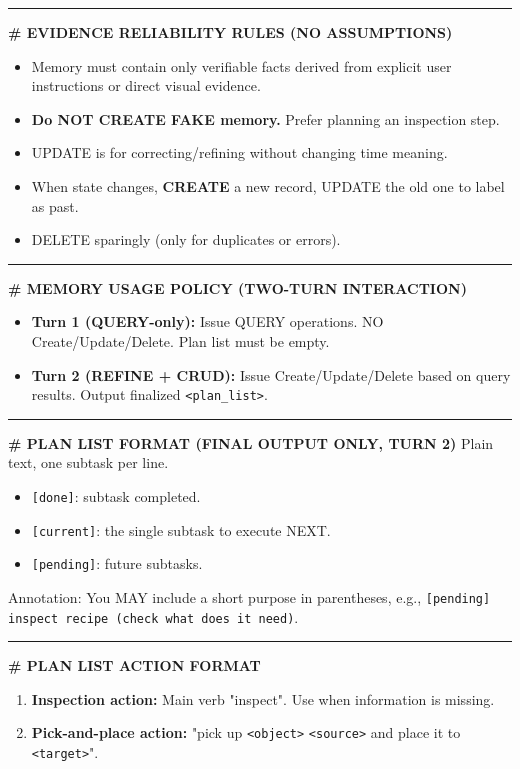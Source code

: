 \begin{tcolorbox}
\noindent\rule{\linewidth}{0.4pt}

\textbf{\# EVIDENCE RELIABILITY RULES (NO ASSUMPTIONS)}
\begin{itemize}[leftmargin=*]
    \item Memory must contain only verifiable facts derived from explicit user instructions or direct visual evidence.
    \item \textbf{Do NOT CREATE FAKE memory.} Prefer planning an inspection step.
    \item UPDATE is for correcting/refining without changing time meaning.
    \item When state changes, \textbf{CREATE} a new record, UPDATE the old one to label as past.
    \item DELETE sparingly (only for duplicates or errors).
\end{itemize}

\noindent\rule{\linewidth}{0.4pt}

\textbf{\# MEMORY USAGE POLICY (TWO-TURN INTERACTION)}
\begin{itemize}[leftmargin=*]
    \item \textbf{Turn 1 (QUERY-only):} Issue QUERY operations. NO Create/Update/Delete. Plan list must be empty.
    \item \textbf{Turn 2 (REFINE + CRUD):} Issue Create/Update/Delete based on query results. Output finalized \texttt{<plan\_list>}.
\end{itemize}

\noindent\rule{\linewidth}{0.4pt}

\textbf{\# PLAN LIST FORMAT (FINAL OUTPUT ONLY, TURN 2)}
Plain text, one subtask per line.
\begin{itemize}
    \item \texttt{[done]}: subtask completed.
    \item \texttt{[current]}: the single subtask to execute NEXT.
    \item \texttt{[pending]}: future subtasks.
\end{itemize}
Annotation: You MAY include a short purpose in parentheses, e.g., \texttt{[pending] inspect recipe (check what does it need)}.

\noindent\rule{\linewidth}{0.4pt}

\textbf{\# PLAN LIST ACTION FORMAT}
\begin{enumerate}[leftmargin=*]
    \item \textbf{Inspection action:} Main verb "inspect". Use when information is missing.
    \item \textbf{Pick-and-place action:} "pick up \texttt{<object>} \texttt{<source>} and place it to \texttt{<target>}".
\end{enumerate}


\end{tcolorbox}
